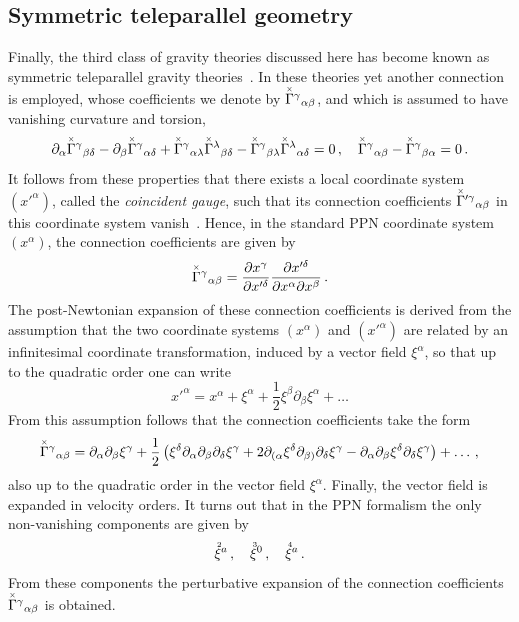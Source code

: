 \documentclass[notitlepage,a4paper,aps,prd,onecolumn,superscriptaddress,nofootinbib,groupedaddress,longbibliography]{revtex4-1}
\newcommand{\order}[2]{\accentset{#2}{#1}}
\newcommand{\st}[1]{\accentset{\times}{#1}}
\begin{document}
\subsection{Symmetric teleparallel geometry}\label{ssec:ppnnonmet}
Finally, the third class of gravity theories discussed here has become known as symmetric teleparallel gravity theories~\cite{Nester:1998mp}. In these theories yet another connection is employed, whose coefficients we denote by \(\st{\Gamma}^{\gamma}{}_{\alpha\beta}\), and which is assumed to have vanishing curvature and torsion,
\begin{equation}
\partial_{\alpha}\st{\Gamma}^{\gamma}{}_{\beta\delta} - \partial_{\beta}\st{\Gamma}^{\gamma}{}_{\alpha\delta} + \st{\Gamma}^{\gamma}{}_{\alpha\lambda}\st{\Gamma}^{\lambda}{}_{\beta\delta} - \st{\Gamma}^{\gamma}{}_{\beta\lambda}\st{\Gamma}^{\lambda}{}_{\alpha\delta} = 0\,, \quad
\st{\Gamma}^{\gamma}{}_{\alpha\beta} - \st{\Gamma}^{\gamma}{}_{\beta\alpha} = 0\,.
\end{equation}
It follows from these properties that there exists a local coordinate system \((x'^{\alpha})\), called the \emph{coincident gauge}, such that its connection coefficients \(\st{\Gamma}'^{\gamma}{}_{\alpha\beta}\) in this coordinate system vanish~\cite{BeltranJimenez:2017tkd}. Hence, in the standard PPN coordinate system \((x^{\alpha})\), the connection coefficients are given by
\begin{equation}
\st{\Gamma}^{\gamma}{}_{\alpha\beta} = \frac{\partial x^{\gamma}}{\partial x'^{\delta}}\frac{\partial x'^{\delta}}{\partial x^{\alpha}\partial x^{\beta}}\,.
\end{equation}
The post-Newtonian expansion of these connection coefficients is derived from the assumption that the two coordinate systems \((x^{\alpha})\) and \((x'^{\alpha})\) are related by an infinitesimal coordinate transformation, induced by a vector field \(\xi^{\alpha}\), so that up to the quadratic order one can write
\begin{equation}
x'^{\alpha} = x^{\alpha} + \xi^{\alpha} + \frac{1}{2}\xi^{\beta}\partial_{\beta}\xi^{\alpha} + \ldots
\end{equation}
From this assumption follows that the connection coefficients take the form
\begin{equation}\label{eq:symgampert}
\st{\Gamma}^{\gamma}{}_{\alpha\beta} = \partial_{\alpha}\partial_{\beta}\xi^{\gamma} + \frac{1}{2}\left(\xi^{\delta}\partial_{\alpha}\partial_{\beta}\partial_{\delta}\xi^{\gamma} + 2\partial_{(\alpha}\xi^{\delta}\partial_{\beta)}\partial_{\delta}\xi^{\gamma} - \partial_{\alpha}\partial_{\beta}\xi^{\delta}\partial_{\delta}\xi^{\gamma}\right) + \ldots\,,
\end{equation}
also up to the quadratic order in the vector field \(\xi^{\alpha}\). Finally, the vector field is expanded in velocity orders. It turns out that in the PPN formalism the only non-vanishing components are given by~\cite{Flathmann:2020zyj}
\begin{equation}\label{eq:xipert}
\order{\xi}{2}^a\,, \quad
\order{\xi}{3}^0\,, \quad
\order{\xi}{4}^a\,.
\end{equation}
From these components the perturbative expansion of the connection coefficients \(\st{\Gamma}^{\gamma}{}_{\alpha\beta}\) is obtained.
\end{document}
